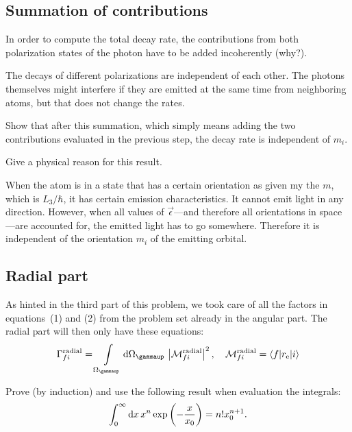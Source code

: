 \documentclass[11pt, english, fleqn, DIV=15, headinclude, BCOR=1.5cm]{scrartcl}
\newcommand\ra{^\text{radial}}
\begin{document}
\subsection{Summation of contributions}

\begin{problem}
    In order to compute the total decay rate, the contributions from both
    polarization states of the photon have to be added incoherently (why?).
\end{problem}

The decays of different polarizations are independent of each other. The
photons themselves might interfere if they are emitted at the same time from
neighboring atoms, but that does not change the rates.

\begin{problem}
    Show that after this summation, which simply means adding the two
    contributions evaluated in the previous step, the decay rate is independent
    of $m_i$.
\end{problem}


\begin{problem}
    Give a physical reason for this result.
\end{problem}

When the atom is in a state that has a certain orientation as given my the $m$,
which is $L_3 / \hbar$, it has certain emission characteristics. It cannot emit
light in any direction. However, when all values of $\vec \epsilon$---and
therefore all orientations in space---are accounted for, the emitted light has
to go somewhere. Therefore it is independent of the orientation $m_i$ of the
emitting orbital.

\subsection{Radial part}

As hinted in the third part of this problem, we took care of all the factors in
equations~(1) and (2) from the problem set already in the angular part. The
radial part will then only have these equations:
\[
    \Gamma_{fi}\ra = \intop_{\Omega_\gammaup} \dif \Omega_\gammaup \,
    \abs{\mathcal M_{fi}\ra}^2
    \eqnsep
    \mathcal M_{fi}\ra = \braket{f|r_\text e|i}
\]

\begin{problem}
    Prove (by induction) and use the following result when evaluation the
    integrals:
    \[
        \int_0^\infty \mathop{}\!\mathrm d x \, x^n \exp\left( - \frac{x}{x_0} \right) = n! x_0^{n+1}.
    \]
\end{problem}
\end{document}
